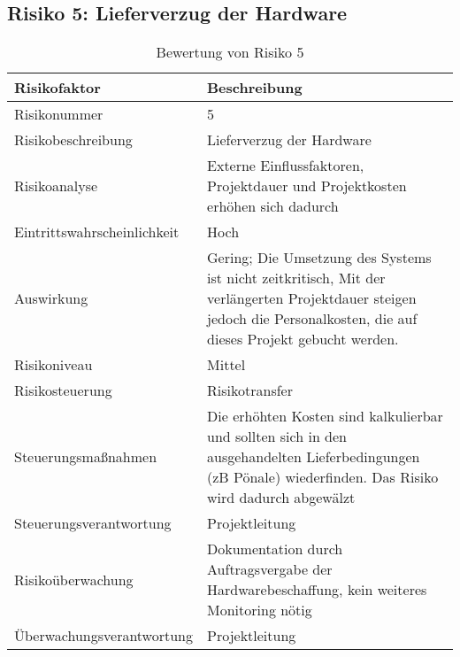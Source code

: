 \FloatBarrier
\newpage
\subsection{Risiko 5: Lieferverzug der Hardware}

\begin{table}[h]
    \centering
    \renewcommand{\arraystretch}{1.5}
    \begin{tabular}{|l|p{10cm}|}
        \hline
        \rowcolor{gray!30} \textbf{Risikofaktor} & \textbf{Beschreibung} \\
        \hline
        Risikonummer & 5 \\
        \hline
        Risikobeschreibung &Lieferverzug der Hardware \\
        \hline
        Risikoanalyse & Externe Einflussfaktoren, Projektdauer und Projektkosten erhöhen sich dadurch \\
        \hline
 		 Eintrittswahrscheinlichkeit & Hoch \\        
        \hline
        Auswirkung & Gering; Die Umsetzung des Systems ist nicht zeitkritisch, Mit der verlängerten Projektdauer steigen jedoch die Personalkosten, die auf dieses Projekt gebucht werden.\\
        \hline
        Risikoniveau & \cellcolor{medium} Mittel \\
        \hline
        Risikosteuerung & Risikotransfer \\
        \hline
        Steuerungsmaßnahmen & Die erhöhten Kosten sind kalkulierbar und sollten sich in den ausgehandelten Lieferbedingungen (zB Pönale) wiederfinden. Das Risiko wird dadurch abgewälzt\\
        \hline
        Steuerungsverantwortung &Projektleitung \\
        \hline
        Risikoüberwachung & Dokumentation durch Auftragsvergabe der Hardwarebeschaffung, kein weiteres Monitoring nötig \\
        \hline
        Überwachungsverantwortung & Projektleitung \\
        \hline
    \end{tabular}
    \caption{Bewertung von Risiko 5}
    \label{tab:risikobewertung5}
\end{table}
